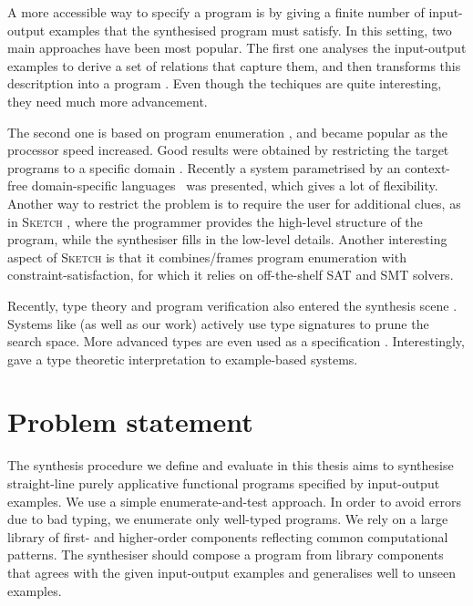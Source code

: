 A more accessible way to specify a program is by giving a finite number of input-output examples that the synthesised program must satisfy.  In this setting, two main approaches have been most popular.  The first one analyses the input-output examples to derive a set of relations that capture them, and then transforms this descritption into a program \cite{Summers:1977:MLP:321992.322002,Kitzelmann:2009:AIF:1530575.1530582,Jha:2010:OCP:1806799.1806833}.  Even though the techiques are quite interesting, they need much more advancement.

The second one is based on program enumeration \cite{LambdaSquarePaper,EscherPaper,MythPaper}, and became popular as the processor speed increased.  Good results were obtained by restricting the target programs to a specific domain \cite{Fischer:2003:ASG:967842.967845,Frigo98fftw:an,Thies2002,Gulwani:2011:ASP:1926385.1926423,Gulwani:2011:SGC:1993498.1993505}. Recently a system parametrised by an context-free domain-specific languages~\cite{Perelman:2014:TS:2594291.2594297} was presented, which gives a lot of flexibility.  Another way to restrict the problem is to require the user for additional clues, as in \textsc{Sketch} \cite{Solar-Lezama:2006:CSF:1168857.1168907}, where the programmer provides the high-level structure of the program, while the synthesiser fills in the low-level details.  Another interesting aspect of \textsc{Sketch} is that it combines/frames program enumeration with constraint-satisfaction, for which it relies on off-the-shelf SAT and SMT solvers.

Recently, type theory and program verification also entered the synthesis scene \cite{LeonPaper,DBLP:journals/corr/InalaQLS15,Kuncak:2010:CFS:1806596.1806632}.  Systems like \cite{LambdaSquarePaper,MythPaper} (as well as our work) actively use type signatures to prune the search space.  More advanced types are even used as a specification \cite{SynquidPaper}.  Interestingly, \cite{Frankle:2016:EST:2837614.2837629} gave a type theoretic interpretation to example-based systems.

\section{Problem statement}\label{Problem}

The synthesis procedure we define and evaluate in this thesis aims to synthesise straight-line purely applicative functional programs specified by input-output examples. We use a simple enumerate-and-test approach. In order to avoid errors due to bad typing, we enumerate only well-typed programs. We rely on a large library of first- and higher-order components reflecting common computational patterns.
The synthesiser should compose a program from library components that agrees with the given input-output examples and generalises well to unseen examples.

